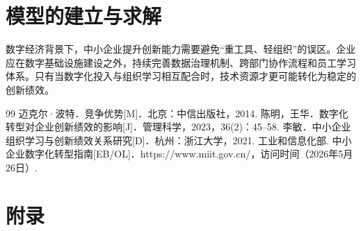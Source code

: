 \documentclass[UTF8,a4paper,11pt,onecolumn,fontset=none]{ctexart}
\begin{document}
\section{模型的建立与求解}
数字经济背景下，中小企业提升创新能力需要避免“重工具、轻组织”的误区。企业应在数字基础设施建设之外，持续完善数据治理机制、跨部门协作流程和员工学习体系。只有当数字化投入与组织学习相互配合时，技术资源才更可能转化为稳定的创新绩效。

\begin{thebibliography}{99}
  迈克尔·波特．竞争优势[M]．北京：中信出版社，2014.
  陈明，王华．数字化转型对企业创新绩效的影响[J]．管理科学，2023，36(2)：45--58.
  李敏．中小企业组织学习与创新绩效关系研究[D]．杭州：浙江大学，2021.
  工业和信息化部. 中小企业数字化转型指南[EB/OL]．https://www.miit.gov.cn/，访问时间（2026年5月26日）.
\end{thebibliography}

\section*{附录}
\end{document}
